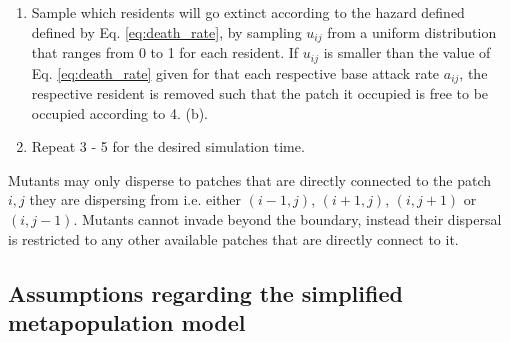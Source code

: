 \documentclass[a4paper]{report}
\begin{document}
{\begin{enumerate}
\begin{enumerate} 

\item The attempted site for invasion already is occupied by a different population of the focal species with a larger base attack rate, if so the invasion attempt is considered to have failed.

\item The attempted site for invasion already is occupied by a different population of the focal species with a smaller base attack rate, if so the base attack rate of that site is then replaced by the mutant's larger base attack rate. 

\item The attempted site for invasion already is not occupied. In which case the new mutant will successfully invade according to Eq. \eqref{eq:prob_invasion}. For each invasion attempt sample a value of $S_R$ that is representative of the range found at equilibrium in the deconstructed assembly model and calculate $y_E$ and $\sigma_E$, the respective numeric estimated mean and standard deviation of the invasion probability Eq. \eqref{eq:birth3}. (Note: If a site was previously occupied but the resident has since gone extinct without being replaced, we assume that when a new mutant attempts to invade it, consumer and resource turnover have occurred in such a way that the invasion probability independent of previous occupancy).
\end{enumerate}
\item Sample which residents will go extinct according to the hazard defined defined by Eq. \eqref{eq:death_rate}, by sampling $u_{ij}$ from a uniform distribution that ranges from 0 to 1 for each resident. If $u_{ij}$ is smaller than the value of Eq. \eqref{eq:death_rate} given for that each respective base attack rate $a_{ij}$, the respective resident is removed such that the patch it occupied is free to be occupied according to 4. (b).
\item Repeat 3 - 5 for the desired simulation time.
\end{enumerate}

  Mutants may only disperse to patches that are directly connected to the patch $i,j$ they are dispersing from i.e. either $(i-1,j)$, $(i+1,j)$, $(i,j+1)$ or $(i,j-1)$. Mutants cannot invade beyond the boundary, instead their dispersal is restricted to any other available patches that are directly connect to it. 
  
\subsection{Assumptions regarding the simplified metapopulation model}
 
}
\end{document}
